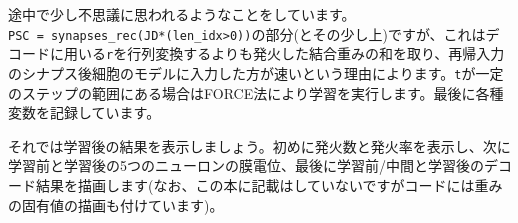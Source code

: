 途中で少し不思議に思われるようなことをしています。\\
\colorbox{shadecolor}{\texttt{PSC = synapses\_rec(JD*(len\_idx>0))}}の部分(とその少し上)ですが、これはデコードに用いる\texttt{r}を行列変換するよりも発火した結合重みの和を取り、再帰入力のシナプス後細胞のモデルに入力した方が速いという理由によります。\texttt{t}が一定のステップの範囲にある場合はFORCE法により学習を実行します。最後に各種変数を記録しています。\par
それでは学習後の結果を表示しましょう。初めに発火数と発火率を表示し、次に学習前と学習後の5つのニューロンの膜電位、最後に学習前/中間と学習後のデコード結果を描画します(なお、この本に記載はしていないですがコードには重みの固有値の描画も付けています)。

